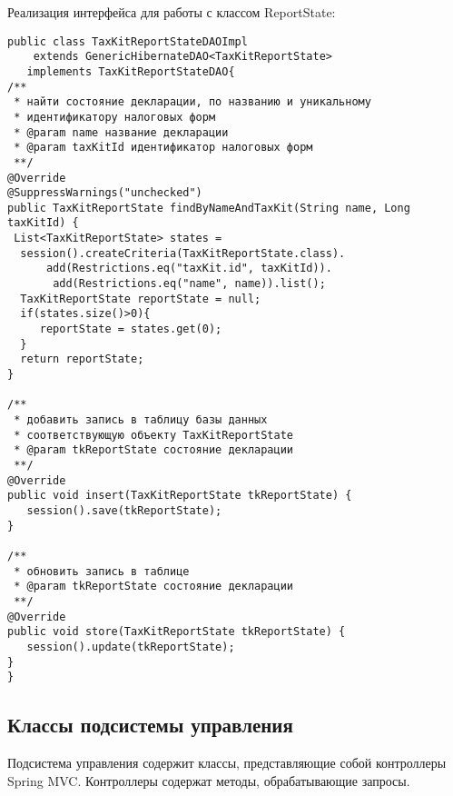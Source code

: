 \documentclass[14pt,a4paper]{reportmod}
\begin{document}
Реализация интерфейса для работы с классом ReportState:
\begin{small}
\begin{verbatim}
public class TaxKitReportStateDAOImpl
    extends GenericHibernateDAO<TaxKitReportState>
   implements TaxKitReportStateDAO{
/**
 * найти состояние декларации, по названию и уникальному
 * идентификатору налоговых форм
 * @param name название декларации
 * @param taxKitId идентификатор налоговых форм
 **/
@Override
@SuppressWarnings("unchecked")
public TaxKitReportState findByNameAndTaxKit(String name, Long taxKitId) {
 List<TaxKitReportState> states =
  session().createCriteria(TaxKitReportState.class).
      add(Restrictions.eq("taxKit.id", taxKitId)).
       add(Restrictions.eq("name", name)).list();
  TaxKitReportState reportState = null;
  if(states.size()>0){
     reportState = states.get(0);
  }
  return reportState;
}

/**
 * добавить запись в таблицу базы данных
 * соответствующую объекту TaxKitReportState
 * @param tkReportState состояние декларации
 **/
@Override
public void insert(TaxKitReportState tkReportState) {
   session().save(tkReportState);
}

/**
 * обновить запись в таблице
 * @param tkReportState состояние декларации
 **/
@Override
public void store(TaxKitReportState tkReportState) {
   session().update(tkReportState);
}
}
\end{verbatim}
\end{small}

\subsection{Классы подсистемы управления}
Подсистема управления содержит классы, представляющие собой контроллеры Spring MVC. Контроллеры содержат методы, обрабатывающие запросы.
\end{document}
